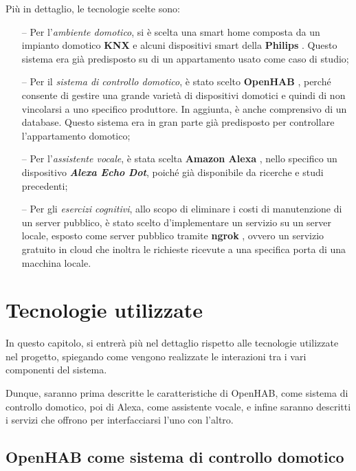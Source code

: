 Più in dettaglio, le tecnologie scelte sono:
\begin{itemize}
  \item[--] Per l’\textit{ambiente domotico}, si è scelta una smart home
        composta da un impianto domotico \textbf{KNX} \cite{KONNEX} e alcuni
        dispositivi smart della \textbf{Philips} \cite{PHILIPS}. Questo
        sistema era già predisposto su di un appartamento usato come caso di
        studio;
  \item[--] Per il \textit{sistema di controllo domotico}, è stato scelto
        \textbf{OpenHAB} \cite{OPENHAB}, perché consente di gestire una grande
        varietà di dispositivi domotici e quindi di non vincolarsi a uno
        specifico produttore. In aggiunta, è anche comprensivo di un database.
        Questo sistema era in gran parte già predisposto per controllare
        l’appartamento domotico;
  \item[--] Per l’\textit{assistente vocale}, è stata scelta \textbf{Amazon
          Alexa} \cite{ALEXA}, nello specifico un dispositivo
        \textit{\textbf{Alexa Echo Dot}}, poiché già disponibile da ricerche
        e studi precedenti;
  \item[--] Per gli \textit{esercizi cognitivi}, allo scopo di eliminare i
        costi di manutenzione di un server pubblico, è stato scelto
        d'implementare un servizio su un server locale, esposto come server
        pubblico tramite \textbf{ngrok} \cite{NGROK}, ovvero un servizio
        gratuito in cloud che inoltra le richieste ricevute a una specifica
        porta di una macchina locale.
\end{itemize}

\section{Tecnologie utilizzate}
\label{sec:Sezione3.2}

In questo capitolo, si entrerà più nel dettaglio rispetto alle tecnologie
utilizzate nel progetto, spiegando come vengono realizzate le interazioni tra i
vari componenti del sistema.

Dunque, saranno prima descritte le caratteristiche di OpenHAB, come sistema di
controllo domotico, poi di Alexa, come assistente vocale, e infine saranno
descritti i servizi che offrono per interfacciarsi l’uno con l’altro.

\subsection{OpenHAB come sistema di controllo domotico}
\label{subsec:Sezione3.2.1}

